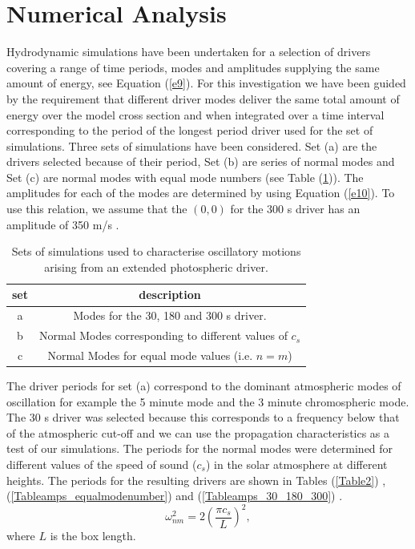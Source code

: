 \documentclass[preprint,authoryear,12pt]{elsarticle}
\begin{document}
\section{Numerical Analysis}
Hydrodynamic simulations have been undertaken for a selection of drivers covering a range of time periods, modes and amplitudes supplying the same amount of energy, see Equation (\ref{e9}). For this investigation we have been guided by the requirement that  different driver modes deliver the same total amount of energy over the model cross section and when integrated over a time interval corresponding to the period of the longest period driver used for the set of simulations. Three sets of simulations have been considered. Set (a) are the drivers selected because of their period, Set (b) are series of normal modes and Set (c) are normal modes with equal mode numbers (see Table (\ref{Table1})). The amplitudes for each of the modes are determined by using  Equation (\ref{e10}). To use this relation, we assume 
that the $(0, 0)$ for the 300 s driver has an amplitude of 350 m/s \citep[see][]{Leighton1960}.
\begin{table}
\centering
\begin{tabular}{c c }
\hline
set   &  description\\
\hline
a &  Modes for the 30, 180 and 300 s driver. \\
\hline
b &  Normal Modes corresponding to different values of $c_s$ \\
\hline
c & Normal Modes for equal mode values (i.e. $n=m$)  \\
\hline
\end{tabular} 
\caption{Sets of simulations used to characterise oscillatory motions arising from an extended photospheric driver.}
\label{Table1}
\end{table}
The driver periods for set (a) correspond to the dominant atmospheric modes of oscillation for example the 5 minute mode and the 3 minute chromospheric mode. The 30 s driver was selected because this corresponds to a frequency below that of the atmospheric cut-off and we can use the propagation characteristics as a test of our simulations. The periods for the normal modes were determined for different values of the speed of sound ($c_s$) in the solar atmosphere at different heights. The periods for the resulting drivers are shown in Tables (\ref{Table2})  ,   (\ref{Tableamps_equalmodenumber}) and (\ref{Tableamps_30_180_300}) .
$$
\omega_{nm}^{2}= 2\left(\frac{\pi c_{s}}{L} \right)^{2},
$$
where $L$ is the box length.
\end{document}
